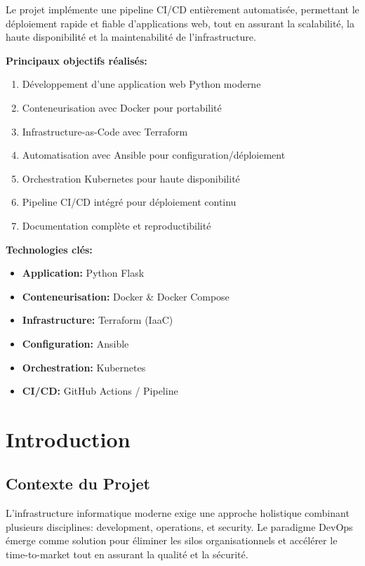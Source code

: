 \documentclass[12pt,a4paper]{report}
\begin{document}
Le projet implémente une pipeline CI/CD entièrement automatisée, permettant le déploiement rapide et fiable d'applications web, tout en assurant la scalabilité, la haute disponibilité et la maintenabilité de l'infrastructure.

\textbf{Principaux objectifs réalisés:}
\begin{enumerate}
    \item Développement d'une application web Python moderne
    \item Conteneurisation avec Docker pour portabilité
    \item Infrastructure-as-Code avec Terraform
    \item Automatisation avec Ansible pour configuration/déploiement
    \item Orchestration Kubernetes pour haute disponibilité
    \item Pipeline CI/CD intégré pour déploiement continu
    \item Documentation complète et reproductibilité
\end{enumerate}

\textbf{Technologies clés:}
\begin{itemize}
    \item \textbf{Application:} Python Flask
    \item \textbf{Conteneurisation:} Docker & Docker Compose
    \item \textbf{Infrastructure:} Terraform (IaaC)
    \item \textbf{Configuration:} Ansible
    \item \textbf{Orchestration:} Kubernetes
    \item \textbf{CI/CD:} GitHub Actions / Pipeline
\end{itemize}

\newpage

\chapter{Introduction}

\section{Contexte du Projet}

L'infrastructure informatique moderne exige une approche holistique combinant plusieurs disciplines: development, operations, et security. Le paradigme DevOps émerge comme solution pour éliminer les silos organisationnels et accélérer le time-to-market tout en assurant la qualité et la sécurité.
\end{document}
